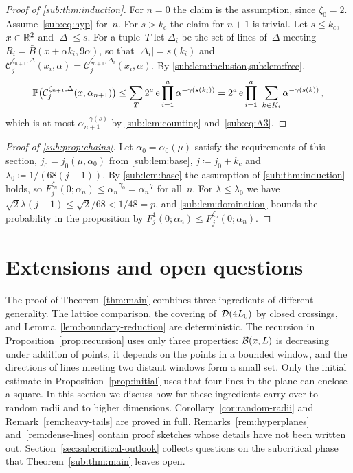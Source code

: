 \documentclass[11pt,letterpaper]{article}
\newcommand{\cC}{\mathcal C}
\begin{document}
\begin{proof}[Proof of \cref{sub:thm:induction}]
For $n=0$ the claim is the assumption, since $\zeta_0=2$. Assume~\eqref{sub:eq:hyp} for~$n$. For $s>k_c$ the claim for $n+1$ is trivial. Let $s\le k_c$, $x\in\mathbb R^2$ and $\lvert\Delta\rvert\le s$. For a tuple~$T$ let $\Delta_i$ be the set of lines of~$\Delta$ meeting $R_i=\bar B(x+\alpha k_i,9\alpha)$, so that $\lvert\Delta_i\rvert=s(k_i)$ and $\cC_j^{\zeta_{n+1},\Delta}(x_i,\alpha)=\cC_j^{\zeta_{n+1},\Delta_i}(x_i,\alpha)$. By \cref{sub:lem:inclusion,sub:lem:free},
\begin{equation*}
  \P\bigl(\cC_j^{\zeta_{n+1},\Delta}(x,\alpha_{n+1})\bigr)\le\sum_T2^a\,\e\prod_{i=1}^a\alpha^{-\gamma(s(k_i))}=2^a\,\e\prod_{i=1}^a\ \sum_{k\in K_i}\alpha^{-\gamma(s(k))}\,,
\end{equation*}
which is at most $\alpha_{n+1}^{-\gamma(s)}$ by \cref{sub:lem:counting} and~\eqref{sub:eq:A3}.
\end{proof}

\begin{proof}[Proof of \cref{sub:prop:chains}]
Let $\alpha_0=\alpha_0(\mu)$ satisfy the requirements of this section, $j_0=j_0(\mu,\alpha_0)$ from \cref{sub:lem:base}, $j\coloneqq j_0+k_c$ and $\lambda_0\coloneqq1/(68(j-1))$. By \cref{sub:lem:base} the assumption of \cref{sub:thm:induction} holds, so $F_j^{\zeta_n}(0;\alpha_n)\le\alpha_n^{-\gamma_0}=\alpha_n^{-7}$ for all~$n$. For $\lambda\le\lambda_0$ we have $\sqrt2\lambda(j-1)\le\sqrt2/68<1/48=p$, and \cref{sub:lem:domination} bounds the probability in the proposition by $F_j^1(0;\alpha_n)\le F_j^{\zeta_n}(0;\alpha_n)$.
\end{proof}

\section{Extensions and open questions}
\label{sec:extensions}

The proof of Theorem~\ref{thm:main} combines three ingredients of different generality. The lattice comparison, the covering of~$\mathcal D(4L_0)$ by closed crossings, and Lemma~\ref{lem:boundary-reduction} are deterministic. The recursion in Proposition~\ref{prop:recursion} uses only three properties: $\mathcal B(x,L)$ is decreasing under addition of points, it depends on the points in a bounded window, and the directions of lines meeting two distant windows form a small set. Only the initial estimate in Proposition~\ref{prop:initial} uses that four lines in the plane can enclose a square. In this section we discuss how far these ingredients carry over to random radii and to higher dimensions. Corollary~\ref{cor:random-radii} and Remark~\ref{rem:heavy-tails} are proved in full. Remarks~\ref{rem:hyperplanes} and~\ref{rem:dense-lines} contain proof sketches whose details have not been written out. Section~\ref{sec:subcritical-outlook} collects questions on the subcritical phase that Theorem~\ref{sub:thm:main} leaves open.
\end{document}
